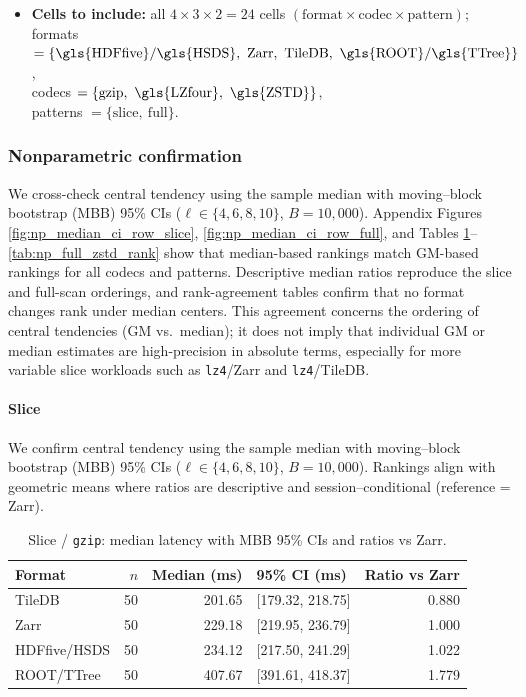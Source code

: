 \documentclass[nomenclature, english, bibtex]{kththesis}
\numberwithin{listing}{chapter}
\begin{document}
\begin{itemize}
  \item \textbf{Cells to include:} all \(4\times 3\times 2=24\) cells \((\text{format}\times\text{codec}\times\text{pattern})\);\\
  formats \(=\{\text{\gls{HDFfive}/\gls{HSDS}},\ \text{Zarr},\ \text{TileDB},\ \text{\gls{ROOT}/\gls{TTree}}\}\),\\
  codecs \(=\{\text{gzip},\ \text{\gls{LZfour}},\ \text{\gls{ZSTD}}\}\),\\
  patterns \(=\{\text{slice},\ \text{full}\}\).
\end{itemize}

\subsubsection{Nonparametric confirmation}
We cross-check central tendency using the sample median with moving–block bootstrap (\gls{MBB}) 95\% \glspl{CI} (\(\ell\in\{4,6,8,10\}\), \(B{=}10{,}000\)). Appendix Figures \ref{fig:np_median_ci_row_slice}, \ref{fig:np_median_ci_row_full}, and Tables \ref{tab:np_slice_gzip_median}–\ref{tab:np_full_zstd_rank} show that median-based rankings match \gls{GM}-based rankings for all codecs and patterns. Descriptive median ratios reproduce the slice and full-scan orderings, and rank-agreement tables confirm that no format changes rank under median centers. This agreement concerns the ordering of central tendencies (\gls{GM} vs.\ median); it does not imply that individual \gls{GM} or median estimates are high-precision in absolute terms, especially for more variable slice workloads such as \texttt{lz4}/Zarr and \texttt{lz4}/TileDB.

\paragraph{Slice}
We confirm central tendency using the sample median with moving–block bootstrap (\gls{MBB}) 95\% \glspl{CI} (\(\ell\in\{4,6,8,10\}\), \(B{=}10{,}000\)). Rankings align with geometric means where ratios are descriptive and session–conditional (reference = Zarr).

\begin{table}[H]
  \centering
  \caption{Slice / \texttt{gzip}: median latency with \gls{MBB} 95\% CIs and ratios vs Zarr.}
  \label{tab:np_slice_gzip_median}
  \begin{tabular}{l r r l r}
    \toprule
    Format & $n$ & Median (ms) & 95\% \gls{CI} (ms) & Ratio vs Zarr \\
    \midrule
    TileDB & 50 & 201.65 & [179.32, 218.75] & 0.880 \\
    Zarr   & 50 & 229.18 & [219.95, 236.79] & 1.000 \\
    \gls{HDFfive}/\gls{HSDS}   & 50 & 234.12 & [217.50, 241.29] & 1.022 \\
    \gls{ROOT}/\gls{TTree}   & 50 & 407.67 & [391.61, 418.37] & 1.779 \\
    \bottomrule
  \end{tabular}
\end{table}
\end{document}
